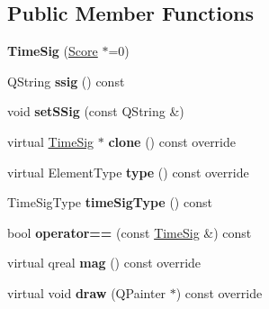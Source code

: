 \subsection*{Public Member Functions}
\begin{DoxyCompactItemize}
\item 
\mbox{\label{class_ms_1_1_time_sig_adf51fa5d173f474ea5705fd66868b7a4}} 
{\bfseries Time\+Sig} (\hyperlink{class_ms_1_1_score}{Score} $\ast$=0)
\item 
\mbox{\label{class_ms_1_1_time_sig_aed33fd1d82c8df6e806699cde11f4a35}} 
Q\+String {\bfseries ssig} () const
\item 
\mbox{\label{class_ms_1_1_time_sig_ad8c5e68f224ca6055da5cd0b34777ce7}} 
void {\bfseries set\+S\+Sig} (const Q\+String \&)
\item 
\mbox{\label{class_ms_1_1_time_sig_a34534e8b151fd0515791bcd502e65713}} 
virtual \hyperlink{class_ms_1_1_time_sig}{Time\+Sig} $\ast$ {\bfseries clone} () const override
\item 
\mbox{\label{class_ms_1_1_time_sig_a7b7a6ef5b6dd60134dfebd9c9c10f121}} 
virtual Element\+Type {\bfseries type} () const override
\item 
\mbox{\label{class_ms_1_1_time_sig_aa96a3e42c031384a82e0b3d078114a02}} 
Time\+Sig\+Type {\bfseries time\+Sig\+Type} () const
\item 
\mbox{\label{class_ms_1_1_time_sig_a0205334cf5a31f77cc37906230b4a019}} 
bool {\bfseries operator==} (const \hyperlink{class_ms_1_1_time_sig}{Time\+Sig} \&) const
\item 
\mbox{\label{class_ms_1_1_time_sig_ae835ea0a4894e4a44a4a107c411ef852}} 
virtual qreal {\bfseries mag} () const override
\item 
\mbox{\label{class_ms_1_1_time_sig_a41314f54b6ed215ed54f0f4e4ff99a53}} 
virtual void {\bfseries draw} (Q\+Painter $\ast$) const override
\item 
\mbox{\label{class_ms_1_1_time_sig_a36c1ab8d9db278b07c3a66aebe0aaf4a}} 

\end{DoxyCompactItemize}
